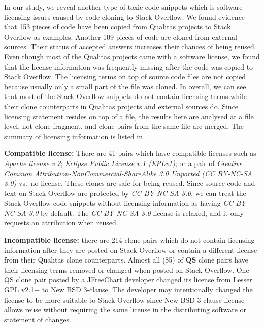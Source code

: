 \documentclass[10pt,journal,compsoc]{IEEEtran}
\begin{document}
In our study, we reveal another type of toxic code snippets which is software
licensing issues caused by code cloning to Stack Overflow. We found evidence that
153 pieces of code have been copied from Qualitas projects to Stack Overflow as
examples. Another 109 pieces of code are cloned from external sources. Their
status of accepted answers increases their chances of being reused. Even though
most of the Qualitas projects came with a software license, we found that the
license information was frequently missing after the code was copied to Stack
Overflow. The licensing terms on top of source code files are not copied because
usually only a small part of the file was cloned. In overall, we can see that
most of the Stack Overflow snippets do not contain licensing terms while their
clone counterparts in Qualitas projects and external sources do. Since licensing
statement resides on top of a file, the results here are analysed at a file level,
not clone fragment, and clone pairs from the same file are merged. 
The summary of licensing information is listed in
.

\textbf{Compatible license:} There are 41 pairs which have compatible
licenses such as \emph{Apache license v.2}; \emph{Eclipse Public
	License v.1 (EPLv1)}; or a pair of \emph{Creative
	Common Attribution-NonCommercial-ShareAlike 3.0 Unported (CC
	BY-NC-SA 3.0)} vs.~no license. These clones are safe for being reused. Since source
code and text on Stack Overflow are
protected by \emph{CC BY-NC-SA 3.0}, we can treat the Stack Overflow code snippets
without licensing information as having \emph{CC BY-NC-SA 3.0} by
default. The \emph{CC BY-NC-SA 3.0} license is relaxed, and it only
requests an attribution when reused.

\textbf{Incompatible license:} there are 214 clone pairs which do not contain
licensing information after they are posted on Stack Overflow or contain a
different license from their Qualitas clone counterparts. Almost all (85) of
\textbf{QS} clone pairs have their licensing terms removed or changed when
posted on Stack Overflow. One QS clone pair posted by a JFreeChart developer
changed its license from Lesser GPL v2.1+ to New BSD 3-clause. The
developer may intentionally changed the license to be more suitable to Stack
Overflow since New BSD 3-clause license allows reuse without requiring the same
license in the distributing software or statement of changes. 
\end{document}
